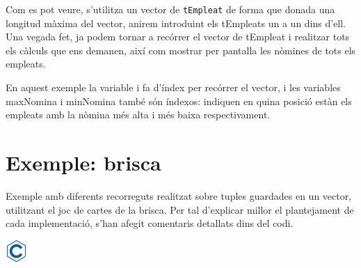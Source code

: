 \documentclass[]{book}
\begin{document}
Com es pot veure, s'utilitza un vector de \texttt{tEmpleat} de forma que donada una longitud màxima del vector, anirem introduint els tEmpleats un a un dins d'ell. Una vegada fet, ja podem tornar a recórrer el vector de tEmpleat i realitzar tots els càlculs que ens demanen, així com mostrar per pantalla les nòmines de tots els empleats.

En aquest exemple la variable i fa d'índex per recórrer el vector, i les variables maxNomina i minNomina també són índexos: indiquen en quina posició estàn els empleats amb la nòmina més alta i més baixa respectivament.

\hypertarget{exemple-brisca}{%
\section{Exemple: brisca}\label{exemple-brisca}}

Exemple amb diferents recorreguts realitzat sobre tuples guardades en un vector, utilitzant el joc de cartes de la brisca. Per tal d'explicar millor el plantejament de cada implementació, s'han afegit comentaris detallats dins del codi.

\includegraphics{./img/c.png}
\end{document}
